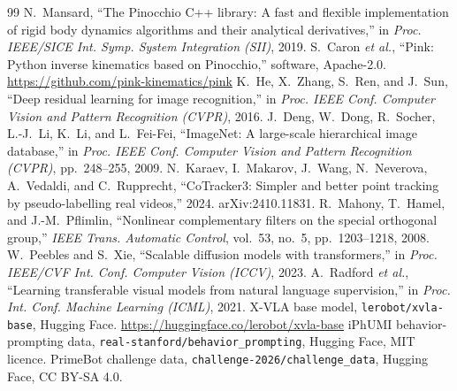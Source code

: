 \documentclass[conference,10pt]{IEEEtran}
\begin{document}
\begin{thebibliography}{99}
N.~Mansard, ``The Pinocchio C++ library: A fast and flexible implementation of rigid body dynamics algorithms and their
analytical derivatives,'' in \emph{Proc. IEEE/SICE Int. Symp. System Integration (SII)}, 2019.
 S.~Caron \emph{et al.}, ``Pink: Python inverse kinematics based on Pinocchio,'' software, Apache-2.0.
\url{https://github.com/pink-kinematics/pink}
 K.~He, X.~Zhang, S.~Ren, and J.~Sun, ``Deep residual learning for image recognition,'' in
\emph{Proc. IEEE Conf. Computer Vision and Pattern Recognition (CVPR)}, 2016.
 J.~Deng, W.~Dong, R.~Socher, L.-J.~Li, K.~Li, and L.~Fei-Fei, ``ImageNet: A large-scale
hierarchical image database,'' in \emph{Proc. IEEE Conf. Computer Vision and Pattern Recognition (CVPR)}, pp.~248--255, 2009.
 N.~Karaev, I.~Makarov, J.~Wang, N.~Neverova, A.~Vedaldi, and C.~Rupprecht, ``CoTracker3:
Simpler and better point tracking by pseudo-labelling real videos,'' 2024. arXiv:2410.11831.
 R.~Mahony, T.~Hamel, and J.-M.~Pflimlin, ``Nonlinear complementary filters on the special
orthogonal group,'' \emph{IEEE Trans. Automatic Control}, vol.~53, no.~5, pp.~1203--1218, 2008.
 W.~Peebles and S.~Xie, ``Scalable diffusion models with transformers,'' in \emph{Proc. IEEE/CVF
Int. Conf. Computer Vision (ICCV)}, 2023.
 A.~Radford \emph{et al.}, ``Learning transferable visual models from natural language
supervision,'' in \emph{Proc. Int. Conf. Machine Learning (ICML)}, 2021.
 X-VLA base model, \texttt{lerobot/xvla-base}, Hugging Face. \url{https://huggingface.co/lerobot/xvla-base}
 iPhUMI behavior-prompting data, \texttt{real-stanford/behavior\_prompting}, Hugging Face, MIT licence.
 PrimeBot challenge data, \texttt{challenge-2026/challenge\_data}, Hugging Face, CC BY-SA 4.0.
\end{thebibliography}
\end{document}
